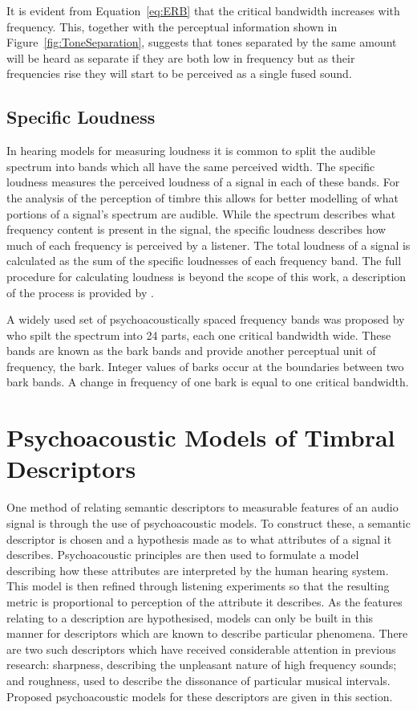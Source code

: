 		It is evident from Equation~\ref{eq:ERB} that the critical bandwidth increases with frequency. This,
		together with the perceptual information shown in Figure~\ref{fig:ToneSeparation}, suggests that tones
		separated by the same amount will be heard as separate if they are both low in frequency but as their
		frequencies rise they will start to be perceived as a single fused sound.

	\subsection{Specific Loudness}
	\label{sec:Timbre-PsychoacousticPrinciples-SpecificLoudness}
		In hearing models for measuring loudness it is common to split the audible spectrum into bands which all
		have the same perceived width. The specific loudness measures the perceived loudness of a signal in each of
		these bands. For the analysis of the perception of timbre this allows for better modelling of what portions
		of a signal's spectrum are audible. While the spectrum describes what frequency content is present in the
		signal, the specific loudness describes how much of each frequency is perceived by a listener.  The total
		loudness of a signal is calculated as the sum of the specific loudnesses of each frequency band. The full
		procedure for calculating loudness is beyond the scope of this work, a description of the process is
		provided by \citet{moore1997a}. 

		A widely used set of psychoacoustically spaced frequency bands was proposed by
		\citet{zwicker1961subdivision} who spilt the spectrum into 24 parts, each one critical bandwidth wide.
		These bands are known as the bark bands and provide another perceptual unit of frequency, the bark. Integer
		values of barks occur at the boundaries between two bark bands. A change in frequency of one bark is equal
		to one critical bandwidth.

\section{Psychoacoustic Models of Timbral Descriptors}
\label{sec:Timbre-TimbralFeatures}
	One method of relating semantic descriptors to measurable features of an audio signal is through the use of
	psychoacoustic models. To construct these, a semantic descriptor is chosen and a hypothesis made as to what
	attributes of a signal it describes. Psychoacoustic principles are then used to formulate a model describing how
	these attributes are interpreted by the human hearing system. This model is then refined through listening
	experiments so that the resulting metric is proportional to perception of the attribute it describes. As the
	features relating to a description are hypothesised, models can only be built in this manner for descriptors which
	are known to describe particular phenomena. There are two such descriptors which have received considerable
	attention in previous research: sharpness, describing the unpleasant nature of high frequency sounds; and
	roughness, used to describe the dissonance of particular musical intervals. Proposed psychoacoustic models for
	these descriptors are given in this section.
	
